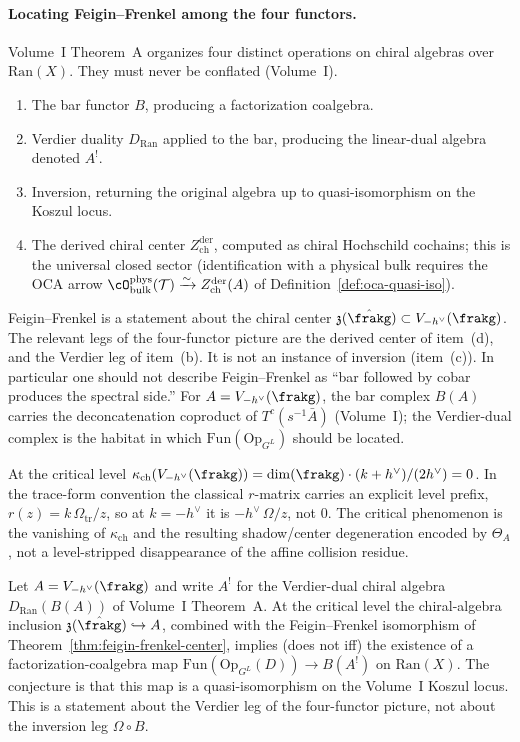 \paragraph{Locating Feigin--Frenkel among the four functors.} Volume~I Theorem~A organizes four distinct operations on chiral algebras over $\mathrm{Ran}(X)$. They must never be conflated (Volume~I).
\begin{enumerate}[label=(\alph*)]
 \item The bar functor $B$, producing a factorization coalgebra.
 \item Verdier duality $D_{\mathrm{Ran}}$ applied to the bar, producing the linear-dual algebra denoted $A^!$.
 \item Inversion, returning the original algebra up to quasi-isomorphism on the Koszul locus.
 \item The derived chiral center $Z^{\mathrm{der}}_{\mathrm{ch}}$, computed as chiral Hochschild cochains; this is the universal closed sector (identification with a physical bulk requires the OCA arrow $\cO^{\mathrm{phys}}_{\mathrm{bulk}}(\mathcal T) \xrightarrow{\sim} Z^{\mathrm{der}}_{\mathrm{ch}}(A)$ of Definition~\ref{def:oca-quasi-iso}).
\end{enumerate}
Feigin--Frenkel is a statement about the chiral center $\mathfrak{z}(\hat{\frakg}) \subset V_{-h^\vee}(\frakg)$. The relevant legs of the four-functor picture are the derived center of item~(d), and the Verdier leg of item~(b). It is not an instance of inversion (item~(c)). In particular one should not describe Feigin--Frenkel as ``bar followed by cobar produces the spectral side.'' For $A = V_{-h^\vee}(\frakg)$, the bar complex $B(A)$ carries the deconcatenation coproduct of $T^c(s^{-1}\bar{A})$ (Volume~I); the Verdier-dual complex is the habitat in which $\mathrm{Fun}(\mathrm{Op}_{G^L})$ should be located.

At the critical level $\kappa_{\mathrm{ch}}(V_{-h^\vee}(\frakg)) = \dim(\frakg) \cdot (k + h^\vee) / (2 h^\vee) = 0$. In the trace-form convention the classical $r$-matrix carries an explicit level prefix, $r(z) = k\,\Omega_{\mathrm{tr}}/z$, so at $k = -h^\vee$ it is $-h^\vee\,\Omega/z$, not $0$. The critical phenomenon is the vanishing of $\kappa_{\mathrm{ch}}$ and the resulting shadow/center degeneration encoded by $\Theta_A$, not a level-stripped disappearance of the affine collision residue.

\begin{conjecture}
\label{conj:critical-self-dual}
\ClaimStatusConjectured
Let $A = V_{-h^\vee}(\frakg)$ and write $A^!$ for the Verdier-dual chiral algebra $D_{\mathrm{Ran}}(B(A))$ of Volume~I Theorem~A. At the critical level the chiral-algebra inclusion $\mathfrak{z}(\hat{\frakg}) \hookrightarrow A$, combined with the Feigin--Frenkel isomorphism of Theorem~\ref{thm:feigin-frenkel-center}, implies (does not iff) the existence of a factorization-coalgebra map $\mathrm{Fun}(\mathrm{Op}_{G^L}(D)) \to B(A^!)$ on $\mathrm{Ran}(X)$. The conjecture is that this map is a quasi-isomorphism on the Volume~I Koszul locus. This is a statement about the Verdier leg of the four-functor picture, not about the inversion leg $\Omega \circ B$.
\end{conjecture}

